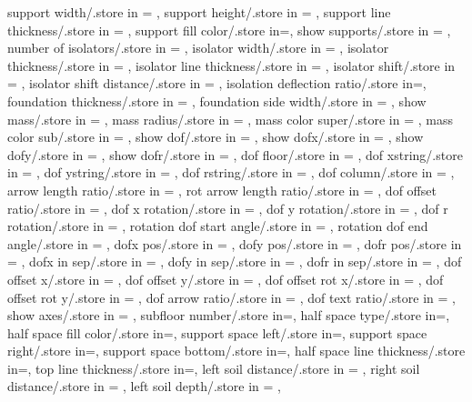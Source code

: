 {  support width/.store in = \supportwidth,
  support height/.store in = \supportheight,
  support line thickness/.store in = \baselinet,
  support fill color/.store in=\supportfillcolor,
  show supports/.store in = \showsupports,
  number of isolators/.store in = \numberofisolators,
  isolator width/.store in = \isolationwidth,
  isolator thickness/.store in = \isolationdepth,
  isolator line thickness/.store in = \isolinet,
  isolator shift/.store in = \isoshiftyn,
  isolator shift distance/.store in = \isoshift,
  isolation deflection ratio/.store in=\isodeflratio,
  foundation thickness/.store in = \foundationdepth,
  foundation side width/.store in = \foundsidew,
  show mass/.store in = \showmass,
  mass radius/.store in = \massrad,
  mass color super/.store in = \masscolorsuper,
  mass color sub/.store in = \masscolorsub,
  show dof/.store in = \showdof,
  show dofx/.store in = \shodofx,
  show dofy/.store in = \shodofy,
  show dofr/.store in = \shodofr,
  dof floor/.store in = \doflocfloor,
  dof xstring/.store in = \dofxstr,
  dof ystring/.store in = \dofystr,
  dof rstring/.store in = \dofrstr,
  dof column/.store in = \dofloccolumn,
  arrow length ratio/.store in = \arrowlenratio,
  rot arrow length ratio/.store in = \rotarrowlenratio,
  dof offset ratio/.store in = \dofoffsetratio,
  dof x rotation/.store in = \dofxrotation,
  dof y rotation/.store in = \dofyrotation,
  dof r rotation/.store in = \dofrrotation,
  rotation dof start angle/.store in = \rotdofstartangle,
  rotation dof end angle/.store in = \rotdofendangle,
  dofx pos/.store in = \dofposx,
  dofy pos/.store in = \dofposy,
  dofr pos/.store in = \dofposr,
  dofx in sep/.store in = \dofinnersepx,
  dofy in sep/.store in = \dofinnersepy,
  dofr in sep/.store in = \dofinnersepr,
  dof offset x/.store in = \dofoffsetx,
  dof offset y/.store in = \dofoffsety,
  dof offset rot x/.store in = \dofrotoffsetx,  
  dof offset rot y/.store in = \dofrotoffsety,
  dof arrow ratio/.store in = \dofarrowratio,
  dof text ratio/.store in = \doftextratio,
  show axes/.store in = \showaxes,
  subfloor number/.store in=\subfloors,
  half space type/.store in=\halfspacetype,
  half space fill color/.store in=\halfspacefillcolor,
  support space left/.store in=\hsdistleft,
  support space right/.store in=\hsdistright,
  support space bottom/.store in=\hsdistbottom,
  half space line thickness/.store in=\hsinnerlinethk,
  top line thickness/.store in=\thinlinethk,
  left soil distance/.store in = \leftsoildist,
  right soil distance/.store in = \rightsoildist,
  left soil depth/.store in = \leftsoildepth,
}
